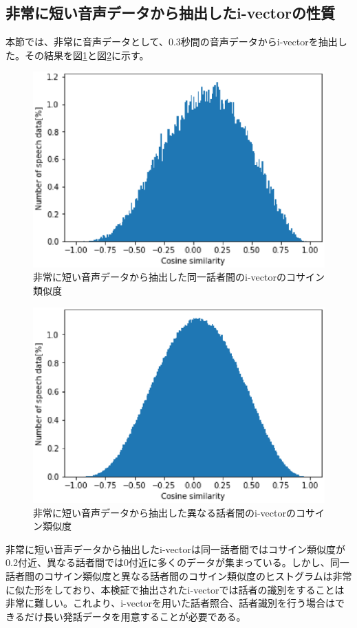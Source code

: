 \subsection{非常に短い音声データから抽出したi-vectorの性質}
本節では、非常に音声データとして、0.3秒間の音声データからi-vectorを抽出した。その結果を図\ref{fig:iv_same_short}と図\ref{fig:iv_other_short}に示す。\par

\begin{figure}[H]
  \begin{center}
    \includegraphics{../../image/same_sp_short_0_3.eps}
  \end{center}
  \caption{非常に短い音声データから抽出した同一話者間のi-vectorのコサイン類似度 \label{fig:iv_same_short}}
\end{figure}

\begin{figure}[H]
  \begin{center}
    \includegraphics{../../image/other_sp_short_0_3.eps}
  \end{center}
  \caption{非常に短い音声データから抽出した異なる話者間のi-vectorのコサイン類似度 \label{fig:iv_other_short}} 
\end{figure}

非常に短い音声データから抽出したi-vectorは同一話者間ではコサイン類似度が0.2付近、異なる話者間では0付近に多くのデータが集まっている。しかし、同一話者間のコサイン類似度と異なる話者間のコサイン類似度のヒストグラムは非常に似た形をしており、本検証で抽出されたi-vectorでは話者の識別をすることは非常に難しい。これより、i-vectorを用いた話者照合、話者識別を行う場合はできるだけ長い発話データを用意することが必要である。
